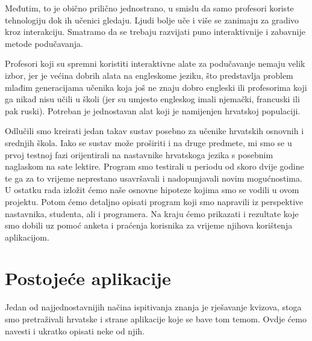 \documentclass[11pt]{scrreprt}
\begin{document}
Međutim, to je obično prilično jednostrano, u smislu da samo profesori koriste
tehnologiju dok ih učenici gledaju. Ljudi bolje uče i više se zanimaju za
gradivo kroz interakciju. Smatramo da se trebaju razvijati puno interaktivnije i
zabavnije metode podučavanja.

Profesori koji su spremni koristiti interaktivne alate za podučavanje nemaju velik
izbor, jer je većina dobrih alata na engleskome jeziku, što predstavlja problem
mlađim generacijama učenika koja još ne znaju dobro engleski ili profesorima
koji ga nikad nisu učili u školi (jer su umjesto engleskog imali njemački,
francuski ili pak ruski). Potreban je jednostavan alat koji je namijenjen
hrvatskoj populaciji.

Odlučili smo kreirati jedan takav sustav posebno za učenike hrvatskih osnovnih
i srednjih škola. Iako se sustav može proširiti i na druge predmete, mi smo se
u prvoj testnoj fazi orijentirali na nastavnike hrvatskoga jezika s posebnim
naglaskom na sate lektire. Program smo testirali u periodu od skoro dvije
godine te ga za to vrijeme neprestano usavršavali i nadopunjavali novim
mogućnostima. U ostatku rada izložit ćemo naše osnovne hipoteze kojima smo se
vodili u ovom projektu. Potom ćemo detaljno opisati program koji smo napravili
iz perspektive nastavnika, studenta, ali i programera. Na kraju ćemo prikazati
i rezultate koje smo dobili uz pomoć anketa i praćenja korisnika za vrijeme
njihova korištenja aplikacijom.

\section*{Postojeće aplikacije}

Jedan od najjednostavnijih načina ispitivanja znanja je rješavanje kvizova,
stoga smo pretraživali hrvatske i strane aplikacije koje se bave tom temom.
Ovdje ćemo navesti i ukratko opisati neke od njih.
\end{document}
